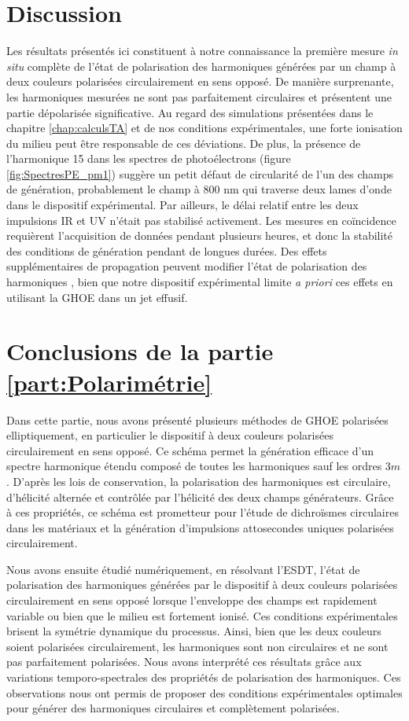 \section{Discussion}
Les résultats présentés ici constituent à notre connaissance la première mesure \textit{in situ} complète de l'état de polarisation des harmoniques générées par un champ à deux couleurs polarisées circulairement en sens opposé. De manière surprenante, les harmoniques mesurées ne sont pas parfaitement circulaires et présentent une partie dépolarisée significative. Au regard des simulations présentées dans le chapitre \ref{chap:calculsTA} et de nos conditions expérimentales, une forte ionisation du milieu peut être responsable de ces déviations. De plus, la présence de l'harmonique 15 dans les spectres de photoélectrons (figure \ref{fig:SpectresPE_pm1}) suggère un petit défaut de circularité de l'un des champs de génération, probablement le champ à 800 nm qui traverse deux lames d'onde dans le dispositif expérimental. Par ailleurs, le délai relatif entre les deux impulsions IR et UV n'était pas stabilisé activement. Les mesures en coïncidence requièrent l'acquisition de données pendant plusieurs heures, et donc la stabilité des conditions de génération pendant de longues durées. Des effets supplémentaires de propagation peuvent modifier l'état de polarisation des harmoniques , bien que notre dispositif expérimental limite \textit{a priori} ces effets en utilisant la GHOE dans un jet effusif.

\section*{Conclusions de la partie \ref{part:Polarimétrie}}
Dans cette partie, nous avons présenté plusieurs méthodes de GHOE polarisées elliptiquement, en particulier le dispositif à deux couleurs polarisées circulairement en sens opposé. Ce schéma permet la génération efficace d'un spectre harmonique étendu composé de toutes les harmoniques sauf les ordres $3m$. D'après les lois de conservation, la polarisation des harmoniques est circulaire, d'hélicité alternée et contrôlée par l'hélicité des deux champs générateurs. Grâce à ces propriétés, ce schéma est prometteur pour l'étude de dichroïsmes circulaires dans les matériaux et la génération d'impulsions attosecondes uniques polarisées circulairement.

Nous avons ensuite étudié numériquement, en résolvant l'ESDT, l'état de polarisation des harmoniques générées par le dispositif à deux couleurs polarisées circulairement en sens opposé lorsque l'enveloppe des champs est rapidement variable ou bien que le milieu est fortement ionisé. Ces conditions expérimentales brisent la symétrie dynamique du processus. Ainsi, bien que les deux couleurs soient polarisées circulairement, les harmoniques sont non circulaires et ne sont pas parfaitement polarisées. Nous avons interprété ces résultats grâce aux variations temporo-spectrales des propriétés de polarisation des harmoniques. Ces observations nous ont permis de proposer des conditions expérimentales optimales pour générer des harmoniques circulaires et complètement polarisées. 

